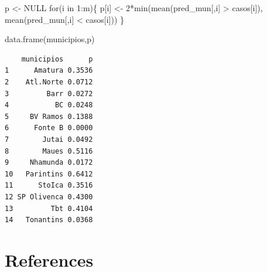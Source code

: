 \documentclass[
  letterpaper,
  DIV=11,
  numbers=noendperiod]{scrreprt}
\newenvironment{Shaded}{\begin{snugshade}}{\end{snugshade}}
\newcommand{\ConstantTok}[1]{\textcolor[rgb]{0.56,0.35,0.01}{#1}}
\newcommand{\ControlFlowTok}[1]{\textcolor[rgb]{0.00,0.23,0.31}{#1}}
\newcommand{\DecValTok}[1]{\textcolor[rgb]{0.68,0.00,0.00}{#1}}
\newcommand{\FunctionTok}[1]{\textcolor[rgb]{0.28,0.35,0.67}{#1}}
\newcommand{\NormalTok}[1]{\textcolor[rgb]{0.00,0.23,0.31}{#1}}
\newcommand{\OtherTok}[1]{\textcolor[rgb]{0.00,0.23,0.31}{#1}}
\newcommand{\SpecialCharTok}[1]{\textcolor[rgb]{0.37,0.37,0.37}{#1}}
\newlength{\cslhangindent}
\newlength{\cslentryspacingunit} %
\newenvironment{CSLReferences}[2] %
 {%
  \setlength{\parindent}{0pt}
  \ifodd #1
  \let\oldpar\par
  \def\par{\hangindent=\cslhangindent\oldpar}
  \fi
  \setlength{\parskip}{#2\cslentryspacingunit}
 }%
 {}
\theoremstyle{definition}
\theoremstyle{definition}
\theoremstyle{remark}
\begin{document}
\begin{Shaded}
\begin{Highlighting}[]
\NormalTok{p }\OtherTok{\textless{}{-}} \ConstantTok{NULL}
\ControlFlowTok{for}\NormalTok{(i }\ControlFlowTok{in} \DecValTok{1}\SpecialCharTok{:}\NormalTok{m)\{}
\NormalTok{p[i] }\OtherTok{\textless{}{-}} \DecValTok{2}\SpecialCharTok{*}\FunctionTok{min}\NormalTok{(}\FunctionTok{mean}\NormalTok{(pred\_mun[,i] }\SpecialCharTok{\textgreater{}}\NormalTok{ casos[i]),}
\FunctionTok{mean}\NormalTok{(pred\_mun[,i] }\SpecialCharTok{\textless{}}\NormalTok{ casos[i]))}
\NormalTok{\}}

\FunctionTok{data.frame}\NormalTok{(municipios,p)}
\end{Highlighting}
\end{Shaded}

\begin{verbatim}
    municipios      p
1      Amatura 0.3536
2    Atl.Norte 0.0712
3         Barr 0.0272
4           BC 0.0248
5     BV Ramos 0.1388
6      Fonte B 0.0000
7        Jutai 0.0492
8        Maues 0.5116
9     Nhamunda 0.0172
10   Parintins 0.6412
11      StoIca 0.3516
12 SP Olivenca 0.4300
13         Tbt 0.4104
14   Tonantins 0.0368
\end{verbatim}


\hypertarget{references}{%
\chapter*{References}\label{references}}


\hypertarget{refs}{}
\begin{CSLReferences}{0}{0}
\end{CSLReferences}
\end{document}

